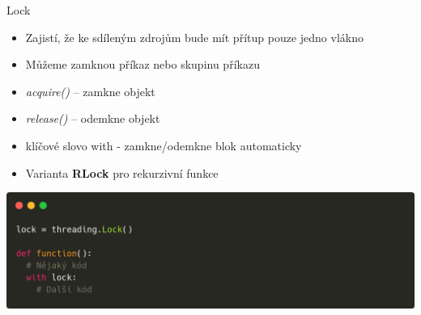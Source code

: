 \documentclass{beamer}
\begin{document}
\begin{frame}[fragile]{Lock}
    \begin{itemize}
            \item Zajistí, že ke sdíleným zdrojům bude mít přítup pouze jedno vlákno
            \item Můžeme zamknou příkaz nebo skupinu příkazu

            \vskip 0.15in
            \item \textit{acquire()} – zamkne objekt
            \item \textit{release()} – odemkne objekt
            \item klíčové slovo with - zamkne/odemkne blok automaticky

            \vskip 0.15in
            \item Varianta \textbf{RLock} pro rekurzivní funkce
    \end{itemize}
    \scriptsize

    \begin{center}
        \includegraphics[width=\textwidth]{obrazky/codes/carbon2.png}
    \end{center}
\end{frame}
\end{document}
